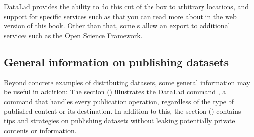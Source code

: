 \sphinxAtStartPar
DataLad provides the ability to do this out of the box to arbitrary locations, and support for specific services such as  that you can read more about in the web version of this book.
Other than that, some {\hyperref[\detokenize{glossary:term-DataLad-extension}]{}}s allow an export to additional services such as the Open Science Framework.


\subsection{General information on publishing datasets}
\label{\detokenize{basics/101-138-sharethirdparty:general-information-on-publishing-datasets}}
\sphinxAtStartPar
Beyond concrete examples of distributing datasets, some general information may be useful in addition:
The section {\hyperref[\detokenize{basics/101-141-push:push}]{}} () illustrates the DataLad command , a command that handles every publication operation, regardless of the type of published content or its destination.
In addition to this, the section {\hyperref[\detokenize{basics/101-139-privacy:privacy}]{}} () contains tips and strategies on publishing datasets without leaking potentially private contents or information.

\sphinxstepscope

\ignorespaces 

